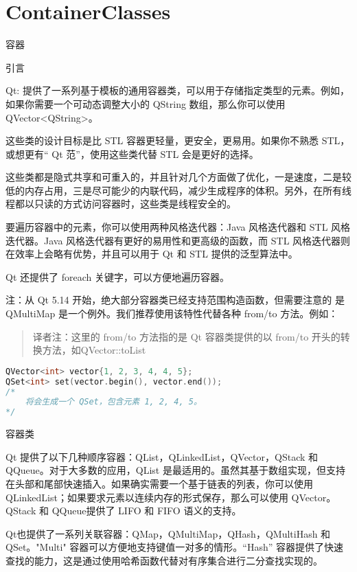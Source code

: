 \chapter{ContainerClasses}

容器

\splitLine

引言

Qt: 提供了一系列基于模板的通用容器类，可以用于存储指定类型的元素。例如，如果你需要一个可动态调整大小的 QString 数组，那么你可以使用 QVector<QString>。

这些类的设计目标是比 STL 容器更轻量，更安全，更易用。如果你不熟悉 STL，或想更有“ Qt 范”，使用这些类代替 STL 会是更好的选择。

这些类都是隐式共享和可重入的，并且针对几个方面做了优化，一是速度，二是较低的内存占用，三是尽可能少的内联代码，减少生成程序的体积。另外，在所有线程都以只读的方式访问容器时，这些类是线程安全的。

要遍历容器中的元素，你可以使用两种风格迭代器：Java 风格迭代器和 STL 风格迭代器。Java 风格迭代器有更好的易用性和更高级的函数，而 STL 风格迭代器则在效率上会略有优势，并且可以用于 Qt 和 STL 提供的泛型算法中。

Qt 还提供了 foreach 关键字，可以方便地遍历容器。

注：从 Qt 5.14 开始，绝大部分容器类已经支持范围构造函数，但需要注意的
是 QMultiMap 是一个例外。我们推荐使用该特性代替各种 from/to 方法。例如：

\begin{quote}
译者注：这里的 from/to 方法指的是 Qt 容器类提供的以 from/to 开头的转换方法，如QVector::toList
\end{quote}

\begin{lstlisting}[language=C++]
QVector<int> vector{1, 2, 3, 4, 4, 5};
QSet<int> set(vector.begin(), vector.end());
/*
    将会生成一个 QSet，包含元素 1, 2, 4, 5。
*/
\end{lstlisting}

容器类

\splitLine

Qt 提供了以下几种顺序容器：QList，QLinkedList，QVector，QStack 和 QQueue。对于大多数的应用，QList 是最适用的。虽然其基于数组实现，但支持在头部和尾部快速插入。如果确实需要一个基于链表的列表，你可以使用 QLinkedList；如果要求元素以连续内存的形式保存，那么可以使用 QVector。QStack 和 QQueue提供了 LIFO 和 FIFO 语义的支持。

Qt也提供了一系列关联容器：QMap，QMultiMap，QHash，QMultiHash 和 QSet。"Multi" 容器可以方便地支持键值一对多的情形。“Hash” 容器提供了快速查找的能力，这是通过使用哈希函数代替对有序集合进行二分查找实现的。

